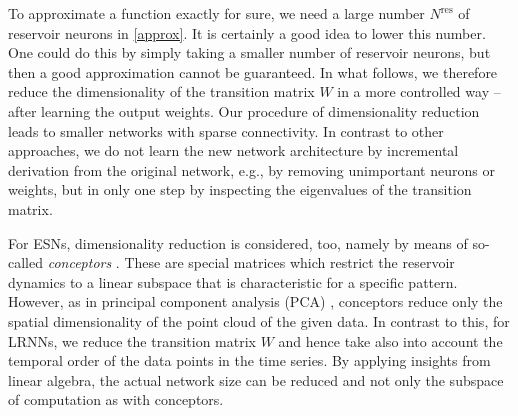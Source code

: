 \documentclass[twoside,11pt]{article}
\theoremstyle{definition}
\begin{document}
To approximate a function exactly for sure, we need a large number
$N^\mathrm{res}$ of reservoir neurons in \cref{approx}. It is certainly a
good idea to lower this number. One could do this by simply taking a smaller
number of reservoir neurons, but then a good approximation cannot be guaranteed.
In what follows, we therefore reduce the dimensionality of the transition matrix $W$ in a
more controlled way -- after learning the output weights. Our procedure of
dimensionality reduction leads to smaller networks with sparse connectivity. In
contrast to other approaches, we do not learn the new network architecture by
incremental derivation from the original network, e.g., by removing unimportant
neurons or weights, but in only one step by inspecting the eigenvalues of the
transition matrix.

For ESNs, dimensionality reduction is considered, too, namely by means of
so-called \emph{conceptors} \citep{Jae14,Jae17,KOS21b}. These are special matrices which
restrict the reservoir dynamics to a linear subspace that is characteristic for
a specific pattern. However, as in principal component analysis (PCA) \citep{Jol11}, conceptors
reduce only the spatial dimensionality of the point cloud of the given data. In
contrast to this, for LRNNs, we reduce the transition matrix $W$ and hence take
also into account the temporal order of the data points in the time series. By
applying insights from linear algebra, the actual network size can be reduced
and not only the subspace of computation as with conceptors.
\end{document}
